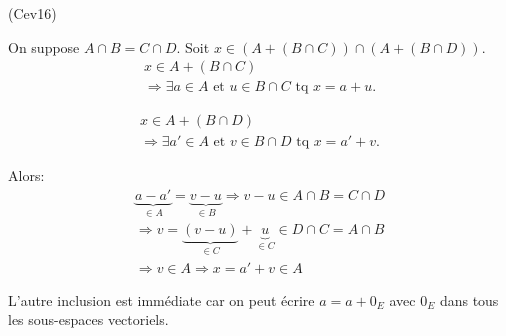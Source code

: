 \begin{tiny}(Cev16)\end{tiny} On suppose $A\cap B = C\cap D$.\newline
Soit $x \in \left(A+(B\cap C) \right) \cap \left(A+(B\cap D) \right)$.
\begin{multline*}
  x \in A+(B\cap C) \\ \Rightarrow \exists a\in A \text{ et } u\in B\cap C \text{ tq } x = a+u.
\end{multline*}

\begin{multline*}
x \in A+(B\cap D) \\ \Rightarrow \exists a'\in A \text{ et } v\in B\cap D\text{ tq } x = a'+v . 
\end{multline*}

Alors:
\begin{multline*}
  \underset{\in A}{\underbrace{a-a'}} = \underset{\in B}{\underbrace{v-u}}
\Rightarrow v-u \in A\cap B = C \cap D \\
\Rightarrow v = \underset{\in C}{\underbrace{(v-u)}} + \underset{\in C}{\underbrace{u}} \in D \cap C = A\cap B \\
\Rightarrow v \in A \Rightarrow x = a' + v \in A
\end{multline*}

L'autre inclusion est immédiate car on peut écrire $a=a+0_E$ avec $0_E$ dans tous les sous-espaces vectoriels.
